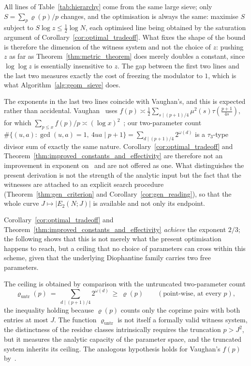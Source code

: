 \documentclass[11pt, a4paper]{article}
\theoremstyle{plain}
\theoremstyle{definition}
\begin{document}
All lines of Table~\ref{tab:hierarchy} come from the same large sieve; only $S=\sum_p\varrho(p)/p$ changes, and the optimisation is always the same: maximise $S$ subject to $S\log z\le\frac12\log N$, each optimised line being obtained by the saturation argument of Corollary~\ref{cor:optimal_tradeoff}. What fixes the shape of the bound is therefore the dimension of the witness system and not the choice of $z$: pushing $z$ as far as Theorem~\ref{thm:metric_theorem} does merely doubles a constant, since $\log\log z$ is essentially insensitive to $z$. The gap between the first two lines and the last two measures exactly the cost of freezing the modulator to $1$, which is what Algorithm~\ref{alg:geom_sieve} does.

The exponents in the last two lines coincide with Vaughan's, and this is expected rather than accidental. Vaughan~\cite{vaughan1970} uses $f(p)\asymp\frac12\sum_{s\mid(p+1)/4}\mu^{2}(s)\tau(\frac{p+1}{4s})$, for which $\sum_{p\le x}f(p)/p\asymp(\log x)^{2}$~\cite[Lemma 4.1]{pomerance2026}; our two-parameter count $\#\{(u,a):\gcd(u,a)=1,\ 4ua\mid p+1\}=\sum_{d\mid(p+1)/4}2^{\omega(d)}$ is a $\tau_3$-type divisor sum of exactly the same nature. Corollary~\ref{cor:optimal_tradeoff} and Theorem~\ref{thm:improved_constants_and_effectivity} are therefore not an improvement in exponent on~\cite{vaughan1970} and are not offered as one. What distinguishes the present derivation is not the strength of the analytic input but the fact that the witnesses are attached to an explicit search procedure (Theorem~\ref{thm:gen_criterion} and Corollary~\ref{cor:gen_reading}), so that the whole curve $J\mapsto|E_2(N;J)|$ is available and not only its endpoint.

Corollary~\ref{cor:optimal_tradeoff} and Theorem~\ref{thm:improved_constants_and_effectivity} \emph{achieve} the exponent $2/3$; the following shows that this is not merely what the present optimisation happens to reach, but a ceiling that no choice of parameters can cross within this scheme, given that the underlying Diophantine family carries two free parameters.

The ceiling is obtained by comparison with the untruncated two-parameter count
$$\varrho_{\mathrm{untr}}(p)\ =\ \sum_{d\mid(p+1)/4}2^{\omega(d)}\ \ge\ \varrho(p)\qquad(\text{point-wise, at every }p),$$
the inequality holding because $\varrho(p)$ counts only the coprime pairs with both entries at most $J$. The function $\varrho_{\mathrm{untr}}$ is not itself a formally valid witness system, the distinctness of the residue classes intrinsically requires the truncation $p>J^{2}$, but it measures the analytic capacity of the parameter space, and the truncated system inherits its ceiling. The analogous hypothesis holds for Vaughan's $f(p)$ by~\cite[Lemma 4.1]{pomerance2026}.
\end{document}
